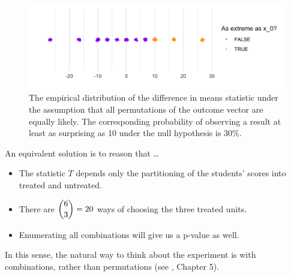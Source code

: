 \documentclass[notes,11pt, aspectratio=169]{beamer}
\begin{document}
\begin{frame}{}

    \begin{figure}
        \centering
        \includegraphics[width = \linewidth]{figures/rand.png}
        \caption*{\small The empirical distribution of the difference in means statistic under the assumption that all permutations of the outcome vector are equally likely. The corresponding probability of observing a result at least as surprising as 10 under the null hypothesis is 30\%.}
        \label{fig:pvalue}
    \end{figure}

\end{frame}

\begin{frame}{}

    An equivalent solution is to reason that \ldots
    \begin{itemize}
       \item The statistic $T$ depends only the partitioning of the students' scores into
       treated and untreated. 
       \item There are $\dbinom{6}{3} = 20$ ways of choosing the three treated units.
       \item  Enumerating all combinations will give us a p-value as well.
    \end{itemize}

    \medskip

    In this sense, the natural way to think about the experiment is with combinations, rather
    than permutations (see \cite{imbens_causal_2015}, Chapter 5).

\end{frame}
\end{document}
